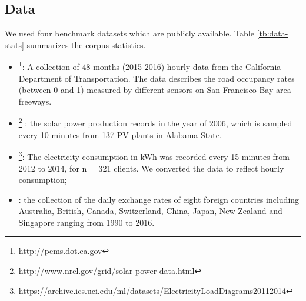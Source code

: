\subsection{Data}
\label{sec:data}
We used four benchmark datasets which are publicly available.
Table \ref{tb:data-stats} summarizes the corpus statistics.
\begin{itemize}
    \item \traffic \footnote{\url{http://pems.dot.ca.gov}}: A collection of 48 months (2015-2016) hourly data from the California Department of Transportation. The data describes the road occupancy rates (between 0 and 1) measured by different sensors on San Francisco Bay area freeways.
    \item \solar \footnote{\url{http://www.nrel.gov/grid/solar-power-data.html}} : the solar power production records in the year of 2006, which is sampled every 10 minutes from 137 PV plants in Alabama State. 
	\item \electricity \footnote{\url{https://archive.ics.uci.edu/ml/datasets/ElectricityLoadDiagrams20112014}}: The electricity consumption in kWh was recorded every 15 minutes from 2012 to 2014, for n = 321 clients. We converted the data to reflect hourly consumption; %
    \item \exchange: the collection of the daily exchange rates of eight foreign countries including Australia, British, Canada, Switzerland, China, Japan, New Zealand and Singapore ranging from 1990 to 2016.
\end{itemize}

